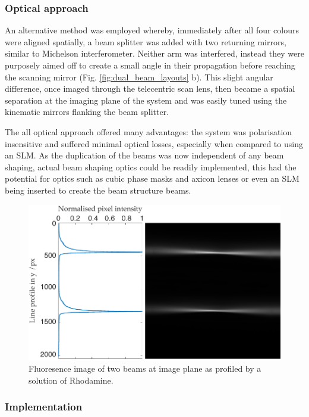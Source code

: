 \subsubsection{Optical approach}
An alternative method was employed whereby, immediately after all four colours were aligned spatially, a beam splitter was added with two returning mirrors, similar to Michelson interferometer.
Neither arm was interfered, instead they were purposely aimed off to create a small angle in their propagation before reaching the scanning mirror (Fig. \ref{fig:dual_beam_layouts} b).
This slight angular difference, once imaged through the telecentric scan lens, then became a spatial separation at the imaging plane of the system and was easily tuned using the kinematic mirrors flanking the beam splitter.

The all optical approach offered many advantages: the system was polarisation insensitive and suffered minimal optical losses, especially when compared to using an SLM.
As the duplication of the beams was now independent of any beam shaping, actual beam shaping optics could be readily implemented, this had the potential for optics such as cubic phase masks and axicon lenses or even an SLM being inserted to create the beam structure beams.

\begin{figure}
  \centering
  \includegraphics{dual_beam_profile}
  \caption{Fluoresence image of two beams at image plane as profiled by a solution of Rhodamine.}
  \label{fig:real_dual_beams}
\end{figure}

\subsubsection{Implementation}

